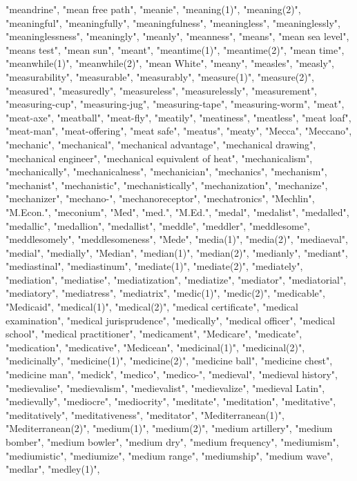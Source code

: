 "meandrine",
"mean free path",
"meanie",
"meaning(1)",
"meaning(2)",
"meaningful",
"meaningfully",
"meaningfulness",
"meaningless",
"meaninglessly",
"meaninglessness",
"meaningly",
"meanly",
"meanness",
"means",
"mean sea level",
"means test",
"mean sun",
"meant",
"meantime(1)",
"meantime(2)",
"mean time",
"meanwhile(1)",
"meanwhile(2)",
"mean White",
"meany",
"measles",
"measly",
"measurability",
"measurable",
"measurably",
"measure(1)",
"measure(2)",
"measured",
"measuredly",
"measureless",
"measurelessly",
"measurement",
"measuring-cup",
"measuring-jug",
"measuring-tape",
"measuring-worm",
"meat",
"meat-axe",
"meatball",
"meat-fly",
"meatily",
"meatiness",
"meatless",
"meat loaf",
"meat-man",
"meat-offering",
"meat safe",
"meatus",
"meaty",
"Mecca",
"Meccano",
"mechanic",
"mechanical",
"mechanical advantage",
"mechanical drawing",
"mechanical engineer",
"mechanical equivalent of heat",
"mechanicalism",
"mechanically",
"mechanicalness",
"mechanician",
"mechanics",
"mechanism",
"mechanist",
"mechanistic",
"mechanistically",
"mechanization",
"mechanize",
"mechanizer",
"mechano-",
"mechanoreceptor",
"mechatronics",
"Mechlin",
"M.Econ.",
"meconium",
"Med",
"med.",
"M.Ed.",
"medal",
"medalist",
"medalled",
"medallic",
"medallion",
"medallist",
"meddle",
"meddler",
"meddlesome",
"meddlesomely",
"meddlesomeness",
"Mede",
"media(1)",
"media(2)",
"mediaeval",
"medial",
"medially",
"Median",
"median(1)",
"median(2)",
"medianly",
"mediant",
"mediastinal",
"mediastinum",
"mediate(1)",
"mediate(2)",
"mediately",
"mediation",
"mediatise",
"mediatization",
"mediatize",
"mediator",
"mediatorial",
"mediatory",
"mediatress",
"mediatrix",
"medic(1)",
"medic(2)",
"medicable",
"Medicaid",
"medical(1)",
"medical(2)",
"medical certificate",
"medical examination",
"medical jurisprudence",
"medically",
"medical officer",
"medical school",
"medical practitioner",
"medicament",
"Medicare",
"medicate",
"medication",
"medicative",
"Medicean",
"medicinal(1)",
"medicinal(2)",
"medicinally",
"medicine(1)",
"medicine(2)",
"medicine ball",
"medicine chest",
"medicine man",
"medick",
"medico",
"medico-",
"medieval",
"medieval history",
"medievalise",
"medievalism",
"medievalist",
"medievalize",
"medieval Latin",
"medievally",
"mediocre",
"mediocrity",
"meditate",
"meditation",
"meditative",
"meditatively",
"meditativeness",
"meditator",
"Mediterranean(1)",
"Mediterranean(2)",
"medium(1)",
"medium(2)",
"medium artillery",
"medium bomber",
"medium bowler",
"medium dry",
"medium frequency",
"mediumism",
"mediumistic",
"mediumize",
"medium range",
"mediumship",
"medium wave",
"medlar",
"medley(1)",
